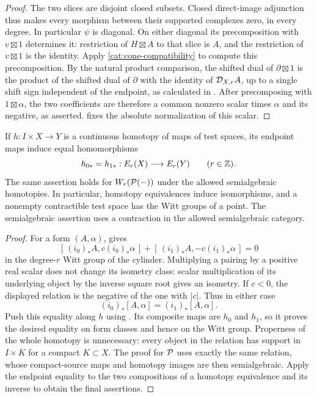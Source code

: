 \begin{proof}
The two slices are disjoint closed subsets.  Closed direct-image
adjunction thus makes every morphism between their supported
complexes zero, in every degree.  In particular $\psi$ is diagonal.
On either diagonal its precomposition with $v\boxtimes1$ determines
it: restriction of $H\boxtimes A$ to that slice is $A$, and the
restriction of $v\boxtimes1$ is the identity.  Apply
\eqref{cat:cone-compatibility} to compute this precomposition.
By the natural product comparison, the shifted dual of
$\partial\boxtimes1$ is the product of the shifted dual of
$\partial$ with the identity of $\mathcal D_{X,r}A$, up to a single shift
sign independent of the endpoint, as calculated in
.
After precomposing with $1\boxtimes\alpha$, the two coefficients
are therefore a common nonzero scalar times $\alpha$ and its
negative, as asserted.   fixes the absolute
normalization of this scalar.
\end{proof}

\begin{theorem}
\label{thm:homotopy}
If $h:I\times X\to Y$ is a continuous homotopy of maps of test
spaces, its endpoint maps induce equal homomorphisms
\[
 h_{0*}=h_{1*}:E_r(X)\longrightarrow E_r(Y)
 \qquad(r\in\mathbb Z).
\]
The same assertion holds for $W_r(\mathcal P(-))$ under the allowed
semialgebraic homotopies.  In particular, homotopy equivalences induce
isomorphisms, and a nonempty contractible test space has the Witt groups
of a point.  The semialgebraic assertion uses a contraction in the
allowed semialgebraic category.
\end{theorem}

\begin{proof}
For a form $(A,\alpha)$,  gives
\[
 [\,(i_0)_*A,c(i_0)_*\alpha\,]
 +[\,(i_1)_*A,-c(i_1)_*\alpha\,]=0
\]
in the degree-$r$ Witt group of the cylinder.  Multiplying a pairing
by a positive real scalar does not change its isometry class: scalar
multiplication of its underlying object by the inverse square root
gives an isometry.  If $c<0$, the displayed relation is the negative
of the one with $|c|$.  Thus in either case
\[
 (i_0)_*[A,\alpha]=(i_1)_*[A,\alpha].
\]
Push this equality along $h$ using
.  Its composite maps are $h_0$ and
$h_1$, so it proves the desired equality on form classes and hence on
the Witt group.  Properness of the whole homotopy is unnecessary:
every object in the relation has support in $I\times K$ for a compact
$K\subset X$.  The proof for $\mathcal P$ uses exactly the same relation,
whose compact-source maps and homotopy images are then semialgebraic.
Apply the endpoint equality to the two compositions of a homotopy
equivalence and its inverse to obtain the final assertions.
\end{proof}

